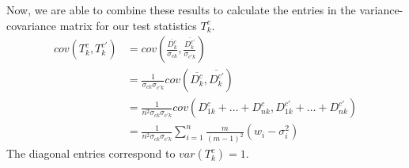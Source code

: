 \documentclass[11pt]{article} %
\begin{document}


Now, we are able to combine these results to calculate the entries in the variance-covariance matrix for our test statistics $T_k^c$.
\begin{align}
cov(T_k^c,T_k^{c'})&=cov(\frac{\overline{D_k^c}}{\sigma_{ck}},\frac{\overline{D_k^{c'}}}{\sigma_{c'k}})\\
&=\frac{1}{\sigma_{ck}\sigma_{c'k}}cov(\overline{D_k^c},\overline{D_k^{c'}})\\
&=\frac{1}{n^2\sigma_{ck}\sigma_{c'k}}cov(D_{1k}^c+\dots+D_{nk}^c,D_{1k}^{c'}+\dots+D_{nk}^{c'})\\
&=\frac{1}{n^2\sigma_{ck}\sigma_{c'k}} \sum_{i=1}^n \frac{m}{(m-1)^2}(w_{i}-\sigma_{i}^2)
\end{align}
The diagonal entries correspond to $var(T_k^c)=1$.
\end{document}
